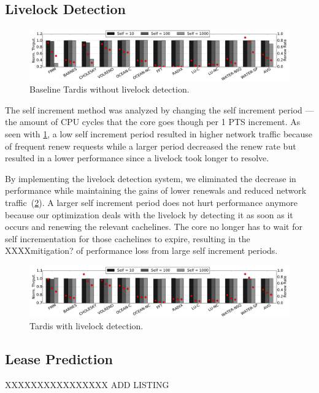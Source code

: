 \documentclass[12pt]{article}
\begin{document}
\subsection{Livelock Detection}

\begin{figure}
	\centering
	\includegraphics[width=0.95\columnwidth]{figs/selfincr_nolive.pdf}
	\caption{ Baseline Tardis without livelock detection. }
	\label{fig:self-nolive}
\end{figure}

The self increment method was analyzed by changing the self increment 
period --- the amount of CPU cycles that the core goes though 
per 1 PTS increment. As seen with \cref{fig:self-nolive}, a low self 
increment period resulted in higher network traffic because of 
frequent renew requests while a larger period decreased the renew rate 
but resulted in a lower performance since a livelock took longer to 
resolve.  
  
  
By implementing the livelock detection system, we eliminated the 
decrease in performance while maintaining the gains of lower renewals 
and reduced network traffic~(\cref{fig:self-live}).  A larger self 
increment period does not hurt performance anymore because our 
optimization deals with the livelock  by detecting 
it as soon as it occurs and renewing the relevant cachelines. The core no longer has to 
wait for self incrementation for those cachelines to expire, resulting in the XXXXmitigation? of performance loss from large self increment 
periods.

\begin{figure}
	\centering
	\includegraphics[width=0.95\columnwidth]{figs/selfincr_live.pdf}
	\caption{ Tardis with livelock detection. }
	\label{fig:self-live}
\end{figure}


\subsection{Lease Prediction}                         \label{sec:opt-lease}                         XXXXXXXXXXXXXXXX ADD LISTING
\end{document}
